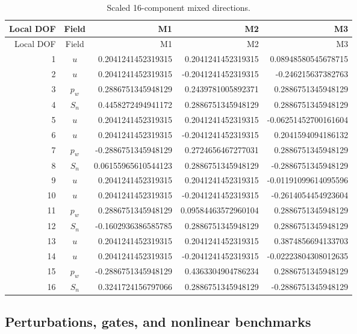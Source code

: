 \documentclass[preprint,12pt,authoryear]{elsarticle}
\begin{document}
\begin{landscape}
\scriptsize
\begin{longtable}{@{}r c rrr@{}}
\caption{Scaled 16-component mixed directions.}\label{stab:directions}\\
\toprule
Local DOF & Field & M1 & M2 & M3\\
\midrule
\endfirsthead
\toprule
Local DOF & Field & M1 & M2 & M3\\
\midrule
\endhead
1 & $u$ & 0.2041241452319315 & 0.2041241452319315 & 0.08948580545678715 \\
2 & $u$ & 0.2041241452319315 & -0.2041241452319315 & -0.246215637382763 \\
3 & $p_w$ & 0.2886751345948129 & 0.2439781005892371 & 0.2886751345948129 \\
4 & $S_n$ & 0.4458272494941172 & 0.2886751345948129 & 0.2886751345948129 \\
5 & $u$ & 0.2041241452319315 & 0.2041241452319315 & -0.06251452700161604 \\
6 & $u$ & 0.2041241452319315 & -0.2041241452319315 & 0.2041594094186132 \\
7 & $p_w$ & -0.2886751345948129 & 0.2724656467277031 & 0.2886751345948129 \\
8 & $S_n$ & 0.06155965610544123 & 0.2886751345948129 & -0.2886751345948129 \\
9 & $u$ & 0.2041241452319315 & 0.2041241452319315 & -0.01191099614095596 \\
10 & $u$ & 0.2041241452319315 & -0.2041241452319315 & -0.2614054454923604 \\
11 & $p_w$ & 0.2886751345948129 & 0.09584463572960104 & 0.2886751345948129 \\
12 & $S_n$ & -0.1602936386585785 & 0.2886751345948129 & 0.2886751345948129 \\
13 & $u$ & 0.2041241452319315 & 0.2041241452319315 & 0.3874856694133703 \\
14 & $u$ & 0.2041241452319315 & -0.2041241452319315 & -0.02223804308012635 \\
15 & $p_w$ & -0.2886751345948129 & 0.4363304904786234 & 0.2886751345948129 \\
16 & $S_n$ & 0.3241724156797066 & 0.2886751345948129 & -0.2886751345948129 \\
\bottomrule
\end{longtable}
\end{landscape}

\subsection{Perturbations, gates, and nonlinear benchmarks}
\end{document}
